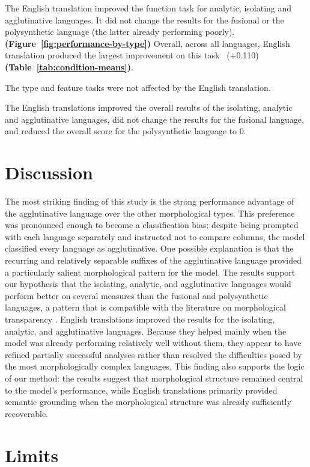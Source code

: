 \documentclass[11pt]{article}
\begin{document}
The English translation improved the function task for analytic, isolating and agglutinative languages. It did not change the results for the fusional or the polysynthetic language (the latter already performing poorly). \textbf{(Figure~\ref{fig:performance-by-type})} Overall, across all languages, English translation produced the largest improvement on this task~ (+0.110) \textbf{(Table~\ref{tab:condition-means})}.

The type and feature tasks were not affected by the English translation.~

The English translations improved the overall results of the isolating, analytic and agglutinative languages, did not change the results for the fusional language, and reduced the overall score for the polysynthetic language to 0.~

\section{Discussion}

The most striking finding of this study is the strong performance advantage of the agglutinative language over the other morphological types. This preference was pronounced enough to become a classification bias: despite being prompted with each language separately and instructed not to compare columns, the model classified every language as agglutinative. One possible explanation is that the recurring and relatively separable suffixes of the agglutinative language provided a particularly salient morphological pattern for the model. The results support our hypothesis that the isolating, analytic, and agglutinative languages would perform better on several measures than the fusional and polysynthetic languages, a pattern that is compatible with the literature on morphological transparency \citep{dressler2005}. English translations improved the results for the isolating, analytic, and agglutinative languages. Because they helped mainly when the model was already performing relatively well without them, they appear to have refined partially successful analyses rather than resolved the difficulties posed by the most morphologically complex languages. This finding also supports the logic of our method: the results suggest that morphological structure remained central to the model's performance, while English translations primarily provided semantic grounding when the morphological structure was already sufficiently recoverable.

\section{Limits}
\end{document}
